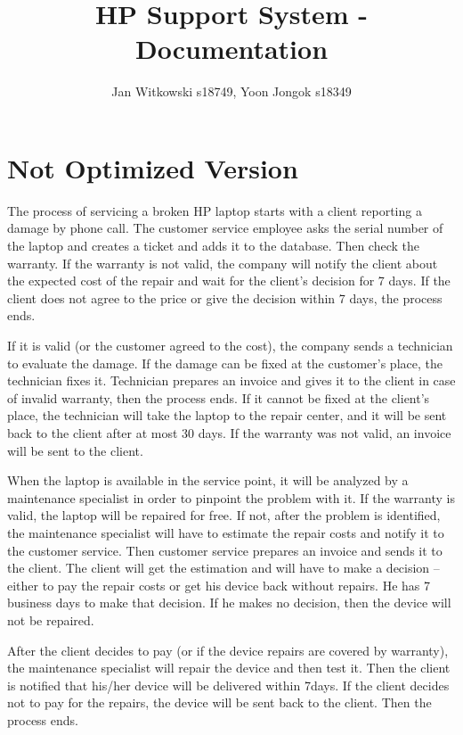 \documentclass[12pt]{article}
\author{Jan Witkowski s18749, Yoon Jongok s18349}
\title{HP Support System - Documentation}
\begin{document}
  \maketitle

  \section{Not Optimized Version}
  The process of servicing a broken HP laptop starts with a client reporting a damage by phone call.
  The customer service employee asks the serial number of the laptop and creates a ticket and adds it to the database.
  Then check the warranty.
  If the warranty is not valid, the company will notify the client about the expected cost of the repair and wait for the client’s decision for 7 days.
  If the client does not agree to the price or give the decision within 7 days, the process ends.
  
  If it is valid (or the customer agreed to the cost), the company sends a technician to evaluate the damage.
  If the damage can be fixed at the customer's place, the technician fixes it.
  Technician prepares an invoice and gives it to the client in case of invalid warranty, then the process ends.
  If it cannot be fixed at the client’s place, the technician will take the laptop to the repair center, and it will be sent back to the client after at most 30 days.
  If the warranty was not valid, an invoice will be sent to the client.
  
  When the laptop is available in the service point, it will be analyzed by a maintenance specialist in order to pinpoint the problem with it.
  If the warranty is valid, the laptop will be repaired for free.
  If not, after the problem is identified, the maintenance specialist will have to estimate the repair costs and notify it to the customer service.
  Then customer service prepares an invoice and sends it to the client.
  The client will get  the estimation and will have to make a decision – either to pay the repair costs or get his device back without repairs.
  He has 7 business days to make that decision.
  If he makes no decision, then the device will not be repaired.
  
  After the client decides to pay (or if the device repairs are covered by warranty), the maintenance specialist will repair the device and then test it.
  Then the client is notified that his/her device will be delivered within 7days.
  If the client decides not to pay for the repairs, the device will be sent back to the client.
  Then the process ends.
\end{document}
